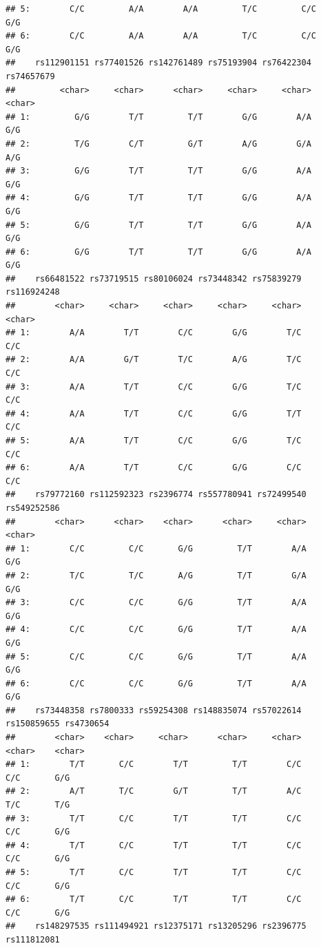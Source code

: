 \documentclass[
]{article}
\begin{document}
\begin{verbatim}
## 5:        C/C         A/A        A/A         T/C         C/C         G/G
## 6:        C/C         A/A        A/A         T/C         C/C         G/G
##    rs112901151 rs77401526 rs142761489 rs75193904 rs76422304 rs74657679
##         <char>     <char>      <char>     <char>     <char>     <char>
## 1:         G/G        T/T         T/T        G/G        A/A        G/G
## 2:         T/G        C/T         G/T        A/G        G/A        A/G
## 3:         G/G        T/T         T/T        G/G        A/A        G/G
## 4:         G/G        T/T         T/T        G/G        A/A        G/G
## 5:         G/G        T/T         T/T        G/G        A/A        G/G
## 6:         G/G        T/T         T/T        G/G        A/A        G/G
##    rs66481522 rs73719515 rs80106024 rs73448342 rs75839279 rs116924248
##        <char>     <char>     <char>     <char>     <char>      <char>
## 1:        A/A        T/T        C/C        G/G        T/C         C/C
## 2:        A/A        G/T        T/C        A/G        T/C         C/C
## 3:        A/A        T/T        C/C        G/G        T/C         C/C
## 4:        A/A        T/T        C/C        G/G        T/T         C/C
## 5:        A/A        T/T        C/C        G/G        T/C         C/C
## 6:        A/A        T/T        C/C        G/G        C/C         C/C
##    rs79772160 rs112592323 rs2396774 rs557780941 rs72499540 rs549252586
##        <char>      <char>    <char>      <char>     <char>      <char>
## 1:        C/C         C/C       G/G         T/T        A/A         G/G
## 2:        T/C         T/C       A/G         T/T        G/A         G/G
## 3:        C/C         C/C       G/G         T/T        A/A         G/G
## 4:        C/C         C/C       G/G         T/T        A/A         G/G
## 5:        C/C         C/C       G/G         T/T        A/A         G/G
## 6:        C/C         C/C       G/G         T/T        A/A         G/G
##    rs73448358 rs7800333 rs59254308 rs148835074 rs57022614 rs150859655 rs4730654
##        <char>    <char>     <char>      <char>     <char>      <char>    <char>
## 1:        T/T       C/C        T/T         T/T        C/C         C/C       G/G
## 2:        A/T       T/C        G/T         T/T        A/C         T/C       T/G
## 3:        T/T       C/C        T/T         T/T        C/C         C/C       G/G
## 4:        T/T       C/C        T/T         T/T        C/C         C/C       G/G
## 5:        T/T       C/C        T/T         T/T        C/C         C/C       G/G
## 6:        T/T       C/C        T/T         T/T        C/C         C/C       G/G
##    rs148297535 rs111494921 rs12375171 rs13205296 rs2396775 rs111812081

\end{verbatim}
\end{document}
